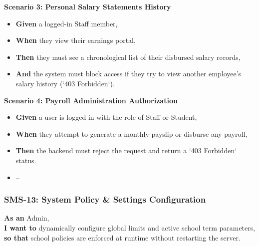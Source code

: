 \noindent\textbf{Scenario 3: Personal Salary Statements History}\\
\begin{itemize}
  \item \textbf{Given} a logged-in Staff member,
  \item \textbf{When} they view their earnings portal,
  \item \textbf{Then} they must see a chronological list of their disbursed salary records,
  \item \textbf{And} the system must block access if they try to view another employee's salary history (`403 Forbidden`).
\end{itemize}


\noindent\textbf{Scenario 4: Payroll Administration Authorization}\\
\begin{itemize}
  \item \textbf{Given} a user is logged in with the role of Staff or Student,
  \item \textbf{When} they attempt to generate a monthly payslip or disburse any payroll,
  \item \textbf{Then} the backend must reject the request and return a `403 Forbidden` status.
\end{itemize}

\begin{itemize}
  \item --
\end{itemize}

\subsubsection{SMS-13: System Policy \& Settings Configuration}
\noindent \textbf{As an} Admin, \\
\noindent \textbf{I want to} dynamically configure global limits and active school term parameters, \\
\noindent \textbf{so that} school policies are enforced at runtime without restarting the server. \\



